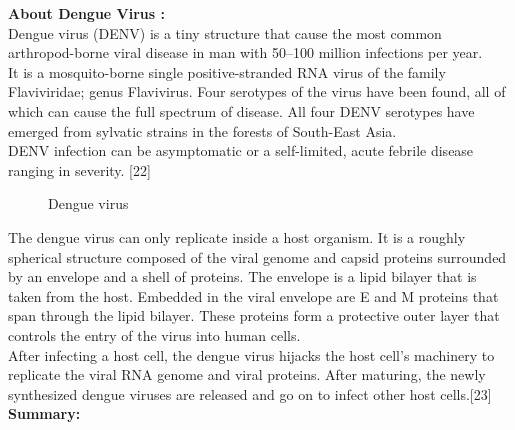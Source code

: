 \documentclass[11pt]{exam}
\begin{document}
\begin{questions}
\textbf{About Dengue Virus :} \\
Dengue virus (DENV) is a tiny structure that cause the most common arthropod-borne viral disease in man with 50–100 million infections per year. \\
It is a mosquito-borne single positive-stranded RNA virus of the family Flaviviridae; genus Flavivirus. Four serotypes of the virus have been found, all of which can cause the full spectrum of disease. All four DENV serotypes have emerged from sylvatic strains in the forests of South-East Asia. \\
DENV infection can be asymptomatic or a self-limited, acute febrile disease ranging in severity. [22]\\

\begin{figure}[H]
  \centering
  \hfill
  \hfill
  \caption{Dengue virus}
  \label{Dengue vectors }
\end{figure} 

The dengue virus can only replicate inside a host organism. It is a roughly spherical structure composed of the viral genome and capsid proteins surrounded by an envelope and a shell of proteins. The envelope is a lipid bilayer that is taken from the host. Embedded in the viral envelope are E and M proteins that span through the lipid bilayer. These proteins form a protective outer layer that controls the entry of the virus into human cells. \\
After infecting a host cell, the dengue virus hijacks the host cell's machinery to replicate the viral RNA genome and viral proteins. After maturing, the newly synthesized dengue viruses are released and go on to infect other host cells.[23]\\

\textbf{Summary:} \\
\\ \\


\end{questions}
\end{document}
